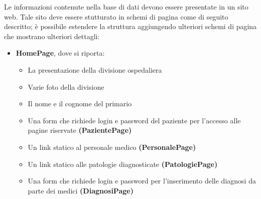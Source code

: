 \documentclass[a4paper,titlepage]{article}
\begin{document}
\noindent
Le informazioni contenute nella base di dati devono essere presentate in un sito web. Tale sito deve essere stutturato in schemi di pagina come di seguito descritto; è possibile estendere la struttura aggiungendo ulteriori schemi di pagina che mostrano ulteriori dettagli:
\noindent
\begin{itemize}[leftmargin=0.75cm, labelsep= 0.5cm]

\item \textbf{HomePage}, dove si riporta:
	\begin{itemize}[leftmargin=1.5cm, labelsep= 0.5cm, label=$\circ$]

	\item La presentazione della divisione ospedaliera
	\item Varie foto della divisione
	\item Il nome e il cognome del primario
	\item Una form che richiede login e password del paziente per l'accesso alle pagine riservate \textbf{(PazientePage)}
	\item Un link statico al personale medico \textbf{(PersonalePage)}
	\item Un link statico alle patologie diagnosticate \textbf{(PatologiePage)}
	\item Una form che richiede login e password per l'inserimento delle diagnosi da parte dei medici \textbf{(DiagnosiPage)}


\end{itemize}
\end{itemize}
\end{document}
